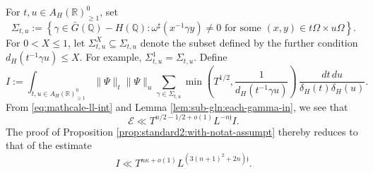 \documentclass[reqno]{amsart}
\theoremstyle{plain} \newtheorem{theorem} {Theorem}
\theoremstyle{definition} \newtheorem{definition} [theorem] {Definition}
\theoremstyle{itplain} %
\numberwithin{equation}{section}
\numberwithin{theorem}{section}
\renewcommand{\geq}{\geqslant}
\renewcommand{\leq}{\leqslant}
\begin{document}
For $t, u \in A_H(\mathbb{R})^0_{\geq 1}$, set
\begin{equation*}
  \Sigma_{t,u} :=
  \left\{ \gamma \in \bar{G}(\mathbb{Q}) - H(\mathbb{Q}) : \text{$\omega^\sharp(x^{-1} \gamma y) \neq 0$ for some $(x,y) \in t \Omega \times u \Omega $} \right\}.
\end{equation*}
For $0 < X \leq 1$, let $\Sigma_{t,u}^X \subseteq \Sigma_{t,u}$ denote the subset defined by the further condition $d_H(t^{-1} \gamma u) \leq X$.  For example, $\Sigma_{t,u}^1 = \Sigma_{t,u}$.  Define
\begin{equation}\label{eq:i-:=-int}
  I := \int _{t, u \in A_H(\mathbb{R})^0_{\geq 1}} \|\Psi\|_t \|\Psi\|_u
  \sum _{\gamma \in \Sigma_{t,u}}
  \min \left( T^{1/2}, \frac{1}{d_H(t^{-1} \gamma u)} \right) \, \frac{d t \, d u}{\delta_H(t) \delta_H(u)}.
\end{equation}
From \eqref{eq:mathcale-ll-int} and Lemma \ref{lem:sub-gln:each-gamma-in}, we see that
\begin{equation*}
  \mathcal{E} \ll T ^{n/2 - 1/2 + o(1)} L^{- n \mathfrak{j}} I.
\end{equation*}
The proof of Proposition \ref{prop:standard2:with-notat-assumpt} thereby reduces to that of the estimate
\begin{equation}\label{eq:i-ll-tnkappa}
  I \ll
  T^{n \kappa + o(1)}
  L^{(3 (n+1)^2  + 2 n) \mathfrak{j}}.
\end{equation}
\end{document}
